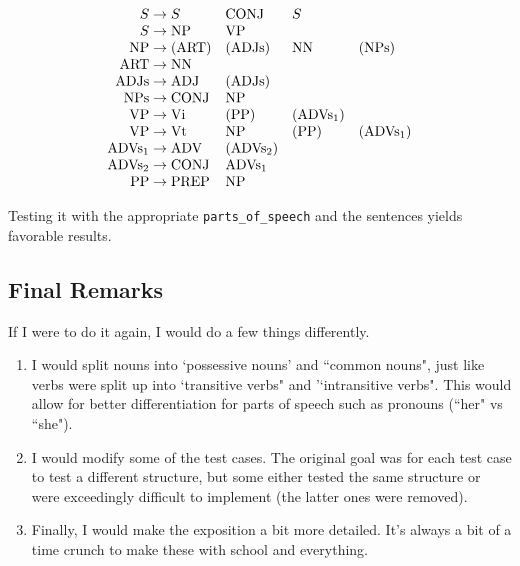 \documentclass{article}
\newcommand{\CONJ}{\text{CONJ}}
\newcommand{\ART}{\text{ART}}
\newcommand{\NPs}{\text{NPs}}
\newcommand{\NP}{\text{NP}}
\newcommand{\NN}{\text{NN}}
\newcommand{\VP}{\text{VP}}
\newcommand{\Vi}{\text{Vi}}
\newcommand{\Vt}{\text{Vt}}
\newcommand{\ADVs}{\text{ADVs}}
\newcommand{\ADV}{\text{ADV}}
\newcommand{\ADJs}{\text{ADJs}}
\newcommand{\ADJ}{\text{ADJ}}
\newcommand{\PP}{\text{PP}}
\newcommand{\PREP}{\text{PREP}}
\begin{document}
    \begin{tcolorbox}[enhanced,colback=Dandelion!30, colframe=Dandelion!50!black,
    width=10cm,
    center,
    drop fuzzy shadow,]
    $$\begin{array}{r@{ {}\rightarrow{} }llll}
        S & S & \CONJ & S \\
        S  & \NP & \VP \\
        \NP & (\ART) & (\ADJs) & \NN & (\NPs) \\
        \ART & \NN \\
        \ADJs & \ADJ & (\ADJs) \\
        \NPs & \CONJ & \NP \\
        \VP & \Vi & (\PP) & (\ADVs_{1}) \\
        \VP & \Vt & \NP & (\PP) & (\ADVs_{1}) \\
        \ADVs_{1} & \ADV & (\ADVs_{2}) \\
        \ADVs_{2} & \CONJ & \ADVs_{1} \\
        \PP & \PREP & \NP
    \end{array}$$
\end{tcolorbox}

Testing it with the appropriate \lstinline{parts_of_speech} and the sentences yields favorable results.

\subsection*{Final Remarks}
    If I were to do it again, I would do a few things differently.
    \begin{enumerate}[label = \arabic*.]
        \item I would split nouns into `possessive nouns' and ``common nouns", just like verbs were split up into `transitive verbs" and '`intransitive verbs". This would allow for better differentiation for parts of speech such as pronouns (``her" vs ``she").
        \item I would modify some of the test cases. The original goal was for each test case to test a different structure, but some either tested the same structure or were exceedingly difficult to implement (the latter ones were removed).
        \item Finally, I would make the exposition a bit more detailed. It's always a bit of a time crunch to make these with school and everything.
    \end{enumerate}
\end{document}
